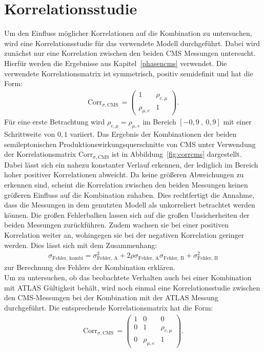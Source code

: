 \section{Korrelationsstudie}
Um den Einfluss möglicher Korrelationen auf die Kombination zu untersuchen, wird eine Korrelationsstudie für das verwendete Modell durchgeführt. Dabei wird zunächst nur eine Korrelation zwischen den beiden CMS Messungen untersucht. Hierfür werden die Ergebnisse aus Kapitel~\ref{phasencms} verwendet. Die verwendete Korrelationsmatrix ist symmetrisch, positiv semidefinit und hat die Form:
\begin{align}
  \text{Corr}_{\sigma,\text{CMS}}\,=\begin{pmatrix}
  1 & \rho_{e, \mu}\\
  \rho_{\mu, e} & 1
  \end{pmatrix}.
  \label{eqn:matrix1}
\end{align}
Für eine erste Betrachtung wird $\rho_{e, \mu}= \rho_{\mu, e}$ im Bereich $[-0,9~,~0,9]$ mit einer Schrittweite von $0,1$ variiert. Das Ergebnis der Kombinationen der beiden semileptonischen Produktionswirkungsquerschnitte von CMS unter Verwendung der Korrelationsmatrix $\text{Corr}_{\sigma,\text{CMS}}$ ist in Abbildung~\ref{fig:corrcms} dargestellt. Dabei lässt sich ein nahezu konstanter Verlauf erkennen, der lediglich im Bereich hoher positiver Korrelationen abweicht. Da keine größeren Abweichungen zu erkennen sind, scheint die Korrelation zwischen den beiden Messungen keinen größeren Einfluss auf die Kombination zuhaben. Dies rechtfertigt die Annahme, dass die Messungen in dem genutzten Modell als unkorreliert betrachtet werden können. Die großen Fehlerbalken lassen sich auf die großen Unsicherheiten der beiden Messungen zurückführen. Zudem wachsen sie bei einer positiven Korrelation weiter an, wohingegen sie bei der negativen Korrelation geringer werden. Dies lässt sich mit dem Zusammenhang:
\begin{align}
  \sigma_{\text{Fehler, kombi}} = \sigma_{\text{Fehler, A}}^2 + 2\rho\sigma_{\text{Fehler, A}}\sigma_{\text{Fehler, B}} + \sigma_{\text{Fehler, B}}^2
\end{align}
zur Berechnung des Fehlers der Kombination erklären.\\
Um zu untersuchen, ob das beobachtete Verhalten auch bei einer Kombination mit ATLAS Gültigkeit behält, wird noch einmal eine Korrelationsstudie zwischen den CMS-Messungen bei der Kombination mit der ATLAS Messung durchgeführt. Die entsprechende Korrelationsmatrix hat die Form:
\begin{align}
  \text{Corr}_{\sigma,\text{CMS}}\,=\begin{pmatrix}
  1 & 0 & 0\\
  0 & 1 &\rho_{e, \mu}\\
  0 & \rho_{\mu, e} & 1
  \end{pmatrix}.
  \label{eqn:matrix2}
\end{align}
